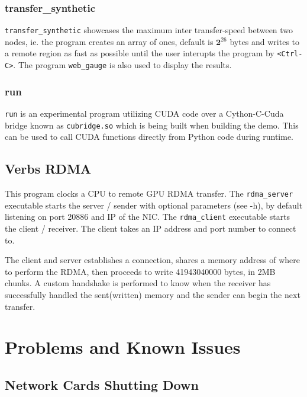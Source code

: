 \documentclass[a4paper,onecolumn]{article}
\begin{document}
\subsubsection{transfer\_synthetic}
\verb|transfer_synthetic| showcases the maximum inter transfer-speed between two nodes, ie. the program creates an array of ones, default is $\bm{2}^{26}$ bytes and writes to a remote region as fast as possible until the user interupts the program by \verb|<Ctrl-C>|. The program \verb|web_gauge| is also used to display the results.

\subsubsection{run}
\verb|run| is an experimental program utilizing CUDA code over a Cython-C-Cuda bridge known as \verb|cubridge.so| which is being built when building the demo. This can be used to call CUDA functions directly from Python code during runtime.

\subsection{Verbs RDMA}
This program clocks a CPU to remote GPU RDMA transfer.
The \verb|rdma_server| executable starts the server / sender with optional parameters (see -h), by default listening on port 20886 and IP of the NIC. The \verb|rdma_client| executable starts the client / receiver. The client takes an IP address and port number to connect to.

The client and server establishes a connection, shares a memory address of where to perform the RDMA, then proceeds to write 41943040000 bytes, in 2MB chunks. A custom handshake is performed to know when the receiver has successfully handled the sent(written) memory and the sender can begin the next transfer.













\section{Problems and Known Issues}

\subsection{Network Cards Shutting Down}
\end{document}
